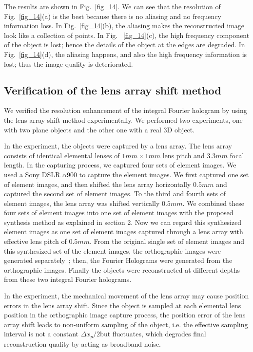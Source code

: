 \documentclass[10pt,letterpaper]{article}
\begin{document}
The results are shown in Fig.~\ref{fig_14}. We can see that the resolution of Fig.~\ref{fig_14}(a) is the best because there is no aliasing and no frequency information loss. In Fig.~\ref{fig_14}(b), the aliasing makes the reconstructed image look like a collection of points. In Fig. ~\ref{fig_14}(c), the high frequency component of the object is lost; hence the details of the object at the edges are degraded. In Fig.~\ref{fig_14}(d), the aliasing happens, and also the high frequency information is lost; thus the image quality is deteriorated.

\subsection{Verification of the lens array shift method}
We verified the resolution enhancement of the integral Fourier hologram by using the lens array shift method experimentally. We performed two experiments, one with two plane objects and the other one with a real 3D object.

In the experiment, the objects were captured by a lens array. The lens array consists of identical elemental lenses of $1mm×1mm$ lens pitch and $3.3mm$ focal length. In the capturing process, we captured four sets of element images. We used a Sony DSLR $\alpha$900 to capture the element images. We first captured one set of element images, and then shifted the lens array horizontally $0.5mm$ and captured the second set of element images. To the third and fourth sets of element images, the lens array was shifted vertically $0.5mm$. We combined these four sets of element images into one set of element images with the proposed synthesis method as explained in section 2. Now we can regard this synthesized element images as one set of element images captured through a lens array with effective lens pitch of $0.5mm$. From the original single set of element images and this synthesized set of the element images, the orthographic images were generated separately~\cite{Park_2008_OE}; then, the Fourier Holograms were generated from the orthographic images. Finally the objects were reconstructed at different depths from these two integral Fourier holograms. 

In the experiment, the mechanical movement of the lens array may cause position errors in the lens array shift. Since the object is sampled at each elemental lens position in the orthographic image capture process, the position error of the lens array shift leads to non-uniform sampling of the object, i.e. the effective sampling interval is not a constant $\Delta x_p/2 $but fluctuates, which degrades final reconstruction quality by acting as broadband noise. 
\end{document}
